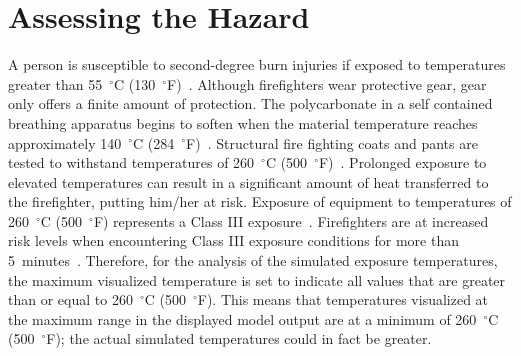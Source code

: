 \documentclass[12pt,oneside]{book}
\begin{document}


\section{Assessing the Hazard}
\label{sec:assessing_the_hazard}

A person is susceptible to second-degree burn injuries if exposed to temperatures greater than 55~$^{\circ}$C (130~$^{\circ}$F)~\cite{contactburn}. Although firefighters wear protective gear, gear only offers a finite amount of protection. The polycarbonate in a self contained breathing apparatus begins to soften when the material temperature reaches approximately 140~$^{\circ}$C (284~$^{\circ}$F)~\cite{mensch2011emergency}. Structural fire fighting coats and pants are tested to withstand temperatures of 260~$^{\circ}$C (500~$^{\circ}$F)~\cite{nfpa2013standard}. Prolonged exposure to elevated temperatures can result in a significant amount of heat transferred to the firefighter, putting him/her at risk. Exposure of equipment to temperatures of 260~$^{\circ}$C (500~$^{\circ}$F) represents a Class III exposure~\cite{Donnelly2006}. Firefighters are at increased risk levels when encountering Class III exposure conditions for more than 5~minutes~\cite{Donnelly2006}. Therefore, for the analysis of the simulated exposure temperatures, the maximum visualized temperature is set to indicate all values that are greater than or equal to 260~$^{\circ}$C (500~$^{\circ}$F). This means that temperatures visualized at the maximum range in the displayed model output are at a minimum of 260~$^{\circ}$C (500~$^{\circ}$F); the actual simulated temperatures could in fact be greater. 
\end{document}
